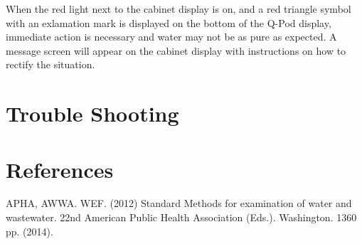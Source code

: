 \documentclass[12pt]{../SOP3_beta}\usepackage[]{graphicx}\usepackage[]{color}
\begin{document}
\NP When the red light next to the cabinet display is on, and a red triangle symbol with an exlamation mark is displayed on the bottom of the Q-Pod display, immediate action is necessary and water may not be as pure as expected. A message screen will appear on the cabinet display with instructions on how to rectify the situation. 

\section{Trouble Shooting}

\section{References}

\NP APHA, AWWA. WEF. (2012) Standard Methods for examination of water and wastewater. 22nd American Public Health Association (Eds.). Washington. 1360 pp. (2014).
\end{document}
